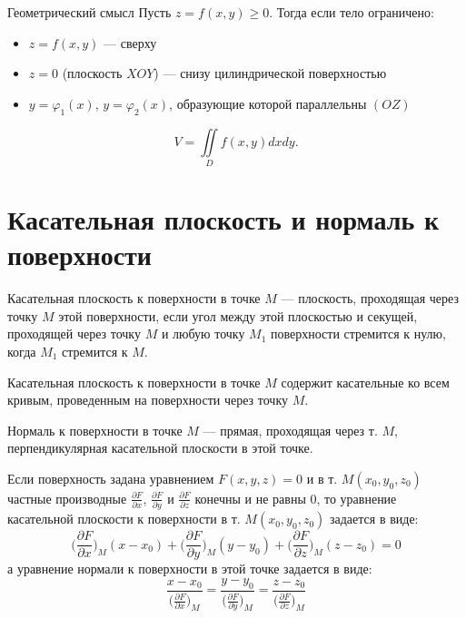 \documentclass[a4paper,12pt,oneside]{extbook}
\theoremstyle{numbered}
\theoremstyle{unnumbered}
\theoremstyle{named}
\theoremstyle{unnumbered}
\theoremstyle{named}
\theoremstyle{named}
\theoremstyle{named}
\begin{document}
Геометрический смысл
Пусть \(z = f(x, y) \geq 0\). Тогда если тело ограничено:
\begin{itemize}
    \item {\(z = f(x, y)\) — сверху}
    \item {\(z = 0\) (плоскость \(XOY\)) — снизу цилиндрической поверхностью}
    \item {\(y = \varphi_1(x)\), \(y = \varphi_2(x)\), образующие которой параллельны \((OZ)\)}
\end{itemize}

\begin{equation}
    V = \iint\limits_D f(x, y)dxdy.
\end{equation}

\section{Касательная плоскость и нормаль к поверхности}%
\label{sec:Касательная плоскость и нормаль к поверхности}

Касательная плоскость к поверхности в точке \(M\) — плоскость, проходящая через точку \(M\) этой поверхности, если угол между этой плоскостью и секущей, проходящей через точку \(M\) и любую точку \(M_1\) поверхности стремится к нулю, когда \(M_1\) стремится к \(M\).

Касательная плоскость к поверхности в точке \(M\) содержит касательные ко всем кривым, проведенным на поверхности через точку \(M\).

Нормаль к поверхности в точке \(M\) — прямая, проходящая через т. \(M\), перпендикулярная касательной плоскости в этой точке.

Если поверхность задана уравнением \(F(x, y, z) = 0\) и в т. \(M(x_0, y_0, z_0)\) частные производные \(\frac{\partial F}{\partial x}\), \(\frac{\partial F}{\partial y}\) и \(\frac{\partial F}{\partial z}\) конечны и не равны 0, то уравнение касательной плоскости к поверхности в т. \(M(x_0, y_0, z_0)\) задается в виде:
\begin{equation}
    \Big(\frac{\partial F}{\partial x}\Big)_M (x - x_0) +  \Big(\frac{\partial F}{\partial y}\Big)_M (y - y_0) + \Big(\frac{\partial F}{\partial z}\Big)_M (z - z_0) = 0
\end{equation}
а уравнение нормали к поверхности в этой точке задается в виде:
\begin{equation}
    \frac{x - x_0}{\Big(\frac{\partial F}{\partial x}\Big)_M} = \frac{y - y_0}{\Big(\frac{\partial F}{\partial y}\Big)_M} = \frac{z - z_0}{\Big(\frac{\partial F}{\partial z}\Big)_M}
\end{equation}
\end{document}
